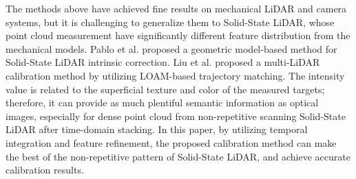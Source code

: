 \documentclass[journal]{vgtc}
\begin{document}
The methods above have achieved fine results on mechanical LiDAR and camera systems, but it is challenging to generalize them to Solid-State LiDAR, whose point cloud measurement have significantly different feature distribution from the mechanical models. Pablo et al.\cite{garcia2020geometric} proposed a geometric model-based method for Solid-State LiDAR intrinsic correction. Liu et al.\cite{lin2020decentralized} proposed a multi-LiDAR calibration method by utilizing LOAM-based trajectory matching. The intensity value is related to the superficial texture and color of the measured targets; therefore, it can provide as much plentiful semantic information as optical images, especially for dense point cloud from non-repetitive scanning Solid-State LiDAR after time-domain stacking.  In this paper, by utilizing temporal integration and feature refinement, the proposed calibration method can make the best of the non-repetitive pattern of Solid-State LiDAR, and achieve accurate calibration results. 


\end{document}
